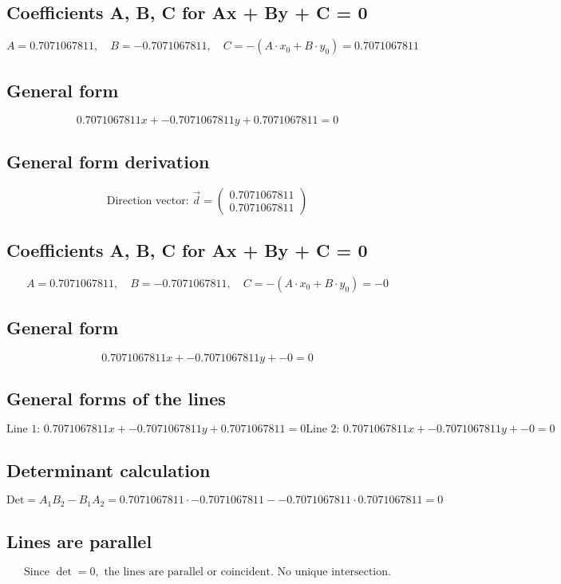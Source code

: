 \documentclass{article}
\begin{document}
\subsection*{ \vspace{1em} Coefficients A, B, C for Ax + By + C = 0}
\[
A = 0.7071067811,\quad B = -0.7071067811,\quad C = - (A \cdot x_0 + B \cdot y_0) = 0.7071067811
\]
\subsection*{ \vspace{1em} General form}
\[
0.7071067811x + -0.7071067811y + 0.7071067811 = 0
\]
\subsection*{ \vspace{1em} General form derivation}
\[
\text{Direction vector: } \vec{d} = \begin{pmatrix}0.7071067811 \\ 0.7071067811\end{pmatrix}
\]
\subsection*{ \vspace{1em} Coefficients A, B, C for Ax + By + C = 0}
\[
A = 0.7071067811,\quad B = -0.7071067811,\quad C = - (A \cdot x_0 + B \cdot y_0) = -0
\]
\subsection*{ \vspace{1em} General form}
\[
0.7071067811x + -0.7071067811y + -0 = 0
\]
\subsection*{ \vspace{1em} General forms of the lines}
\[
\text{Line 1: } 0.7071067811x + -0.7071067811y + 0.7071067811 = 0
\text{Line 2: } 0.7071067811x + -0.7071067811y + -0 = 0
\]
\subsection*{ \vspace{1em} Determinant calculation}
\[
\text{Det} = A_1 B_2 - B_1 A_2 = 0.7071067811 \cdot -0.7071067811 - -0.7071067811 \cdot 0.7071067811 = 0
\]
\subsection*{ \vspace{1em} Lines are parallel}
\[
\text{Since } \det = 0, \text{ the lines are parallel or coincident. No unique intersection.}
\]
\end{document}
